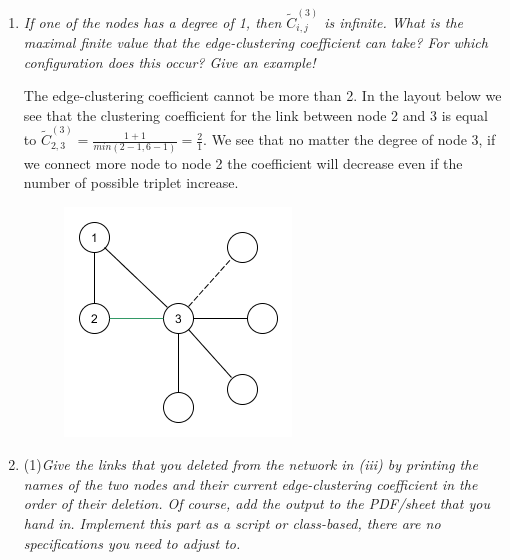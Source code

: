 \documentclass[10pt,a4paper]{article}
\begin{document}
\begin{enumerate}
	\item \textit{If one of the nodes has a degree of 1, then $\tilde{C}_{i,j}^{(3)} $ is infinite. What is the maximal finite value that the edge-clustering coefficient can take? For which configuration does this occur? Give an example!}
	
	The edge-clustering coefficient cannot be more than 2. In the layout below we see that the clustering coefficient for the link between node 2 and 3 is equal to $\tilde{C}_{2,3}^{(3)} = \frac{1 + 1}{min(2 - 1, 6 - 1)} = \frac{2}{1}$. We see that no matter the degree of node 3, if we connect more node to node 2 the coefficient will decrease even if the number of possible triplet increase. 
	
	
\begin{figure}[H]
	\centering
	\includegraphics[width=0.5\linewidth]{expl}
	\caption{}
	\label{fig:expl}
\end{figure}
	
	
	\item (1)\textit{Give the links that you deleted from the network in (iii) by printing the names of the
		two nodes and their current edge-clustering coefficient in the order of their deletion. Of
		course, add the output to the PDF/sheet that you hand in. Implement this part as a
		script or class-based, there are no specifications you need to adjust to.}
	

\end{enumerate}
\end{document}
